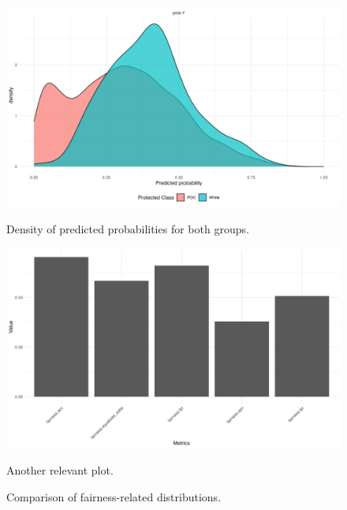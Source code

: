 \begin{figure}
    \centering
    \begin{minipage}{0.48\textwidth}
        \centering
        \includegraphics[width=\textwidth]{../figures/sqf_case_study_plot1.png}
        \caption{Density of predicted probabilities for both groups.}
        \label{fig:fairness_density}
    \end{minipage}
    \hfill
    \begin{minipage}{0.48\textwidth}
        \centering
        \includegraphics[width=\textwidth]{../figures/sqf_case_study_plot2.png}
        \caption{Another relevant plot.}
        \label{fig:fairness_other}
    \end{minipage}
    \caption{Comparison of fairness-related distributions.}
    \label{fig:fairness_comparison}
\end{figure}



